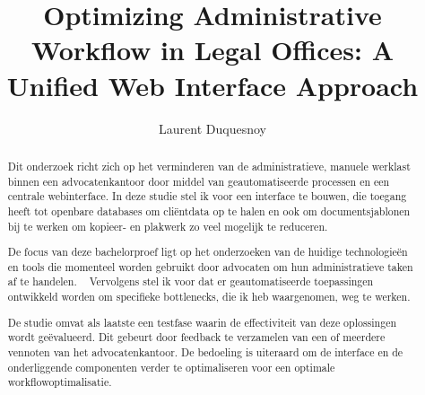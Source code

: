 \documentclass{hogent-article}
\title{Optimizing Administrative Workflow in Legal Offices: A Unified Web Interface Approach}
\author{Laurent Duquesnoy}
\begin{document}
\begin{abstract}
  Dit onderzoek richt zich op het verminderen van de administratieve, manuele werklast binnen een advocatenkantoor door middel van geautomatiseerde processen en een 
  centrale webinterface.   
  In deze studie stel ik voor een interface te bouwen, die toegang heeft tot openbare databases om cliëntdata op te halen en ook om 
  documentsjablonen bij te werken om kopieer- en plakwerk zo veel mogelijk te reduceren.
  
  De focus van deze bachelorproef ligt op het onderzoeken van de huidige technologieën en tools die
  momenteel worden gebruikt door advocaten om hun administratieve taken af te handelen. 
  Vervolgens stel ik voor dat er geautomatiseerde toepassingen ontwikkeld worden om specifieke bottlenecks, die ik heb waargenomen, weg te werken.
  
  De studie omvat als laatste een testfase waarin de effectiviteit van deze oplossingen wordt geëvalueerd. 
  Dit gebeurt door feedback te verzamelen van een of meerdere vennoten van het advocatenkantoor. De bedoeling is uiteraard om de interface en de onderliggende componenten
  verder te optimaliseren voor een optimale workflowoptimalisatie.
\end{abstract}

\tableofcontents



\printbibliography[heading=bibintoc]
\end{document}
